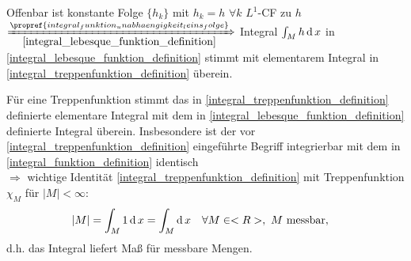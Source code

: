 Offenbar ist konstante Folge $\{ h_k\}$ mit $h_k = h$ $\forall k$ $L^1$-CF zu $h$ \\
$\xRightarrow[\eqref{integral_lebesque_funktion_definition}]{\propref{integral_funktion_unabhaengigkeit_leins_folge}}$ Integral $\int_M h \operatorname{d} x$ in \eqref{integral_lebesque_funktion_definition} stimmt mit elementarem Integral in \eqref{integral_treppenfunktion_definition} überein.

\begin{conclusion}
	Für eine Treppenfunktion stimmt das in \eqref{integral_treppenfunktion_definition} definierte elementare Integral mit dem in \eqref{integral_lebesque_funktion_definition} definierte Integral überein. Insbesondere ist der vor \eqref{integral_treppenfunktion_definition} eingeführte Begriff integrierbar mit dem in \eqref{integral_funktion_definition} identisch\\
	$\Rightarrow$ wichtige Identität \eqref{integral_treppenfunktion_definition} mit Treppenfunktion $\chi_M$ für $\vert M \vert < \infty$: \begin{align*}
		\vert M \vert &= \int_M 1\operatorname{d} x = \int_M \operatorname{d} x\quad\forall M\in<R>,\text{ $M$ messbar},
	\end{align*}
	d.h. das Integral liefert Maß für messbare Mengen.
\end{conclusion}

